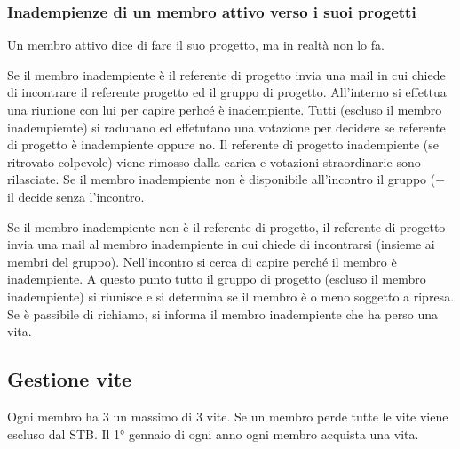 \documentclass[pdf]{article}
\theoremstyle{definition}
\begin{document}

\subsubsection{Inadempienze di un membro attivo verso i suoi progetti}

Un membro attivo dice di fare il suo progetto, ma in realtà non lo fa.


Se il membro inadempiente è il referente di progetto  invia una mail in cui chiede di incontrare il referente progetto ed il gruppo di progetto. All'interno si effettua una riunione con lui per capire perhcé è inadempiente. Tutti (escluso il membro inadempiemte) si radunano ed effetutano una votazione per decidere se referente di progetto è inadempiente oppure no. Il referente di progetto inadempiente (se ritrovato colpevole) viene rimosso dalla carica e votazioni straordinarie sono rilasciate. Se il membro inadempiente non è disponibile all'incontro il gruppo (+ il  decide senza l'incontro.

Se il membro inadempiente non è il referente di progetto, il referente di progetto invia una mail al membro inadempiente in cui chiede di incontrarsi (insieme ai membri del gruppo). Nell'incontro si cerca di capire perché il membro è inadempiente. A questo punto tutto il gruppo di progetto (escluso il membro inadempiente) si riunisce e si determina se il membro è o meno soggetto a ripresa. Se è passibile di richiamo, si informa il membro inadempiente che ha perso una vita.


\subsection{Gestione vite}

Ogni membro ha 3 un massimo di 3 vite. Se un membro perde tutte le vite viene escluso dal STB. Il 1° gennaio di ogni anno ogni membro acquista una vita.
\end{document}
